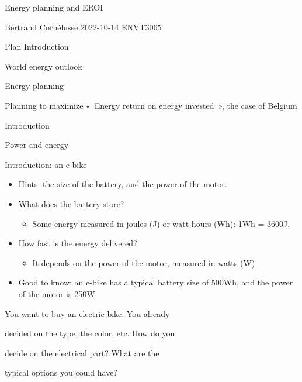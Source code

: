 \begin{frame}{Energy planning and EROI}
\label{energy-planning-and-eroi}
\end{frame}

\begin{frame}{Bertrand Cornélusse}
\label{bertrand-cornuxe9lusse}
2022-10-14 ENVT3065
\end{frame}

\begin{frame}{Plan}
\label{plan}
Introduction

World energy outlook

Energy planning

Planning to maximize «~Energy return on energy invested~», the case of
Belgium
\end{frame}

\begin{frame}{Introduction}
\label{introduction}
\end{frame}

\begin{frame}{Power and energy}
\label{power-and-energy}
\end{frame}

\begin{frame}{Introduction: an e-bike}
\label{introduction-an-e-bike}
\begin{itemize}
\tightlist
\item
  Hints: the size of the battery, and the power of the motor.
\item
  What does the battery store?

  \begin{itemize}
  \tightlist
  \item
    Some energy measured in joules (J) or watt-hours (Wh): 1Wh = 3600J.
  \end{itemize}
\item
  How fast is the energy delivered?

  \begin{itemize}
  \tightlist
  \item
    It depends on the power of the motor, measured in watts (W)
  \end{itemize}
\item
  Good to know: an e-bike has a typical battery size of 500Wh, and the
  power of the motor is 250W.
\end{itemize}

You want to buy an electric bike. You already

decided on the type, the color, etc. How do you

decide on the electrical part? What are the

typical options you could have?
\end{frame}

